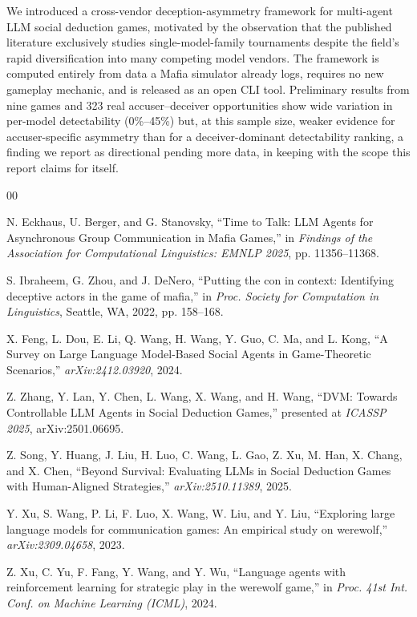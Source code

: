 \documentclass[10pt,conference]{IEEEtran}
\begin{document}
We introduced a cross-vendor deception-asymmetry framework for multi-agent LLM social deduction games, motivated by the observation that the published literature exclusively studies single-model-family tournaments despite the field's rapid diversification into many competing model vendors. The framework is computed entirely from data a Mafia simulator already logs, requires no new gameplay mechanic, and is released as an open CLI tool. Preliminary results from nine games and 323 real accuser--deceiver opportunities show wide variation in per-model detectability (0\%--45\%) but, at this sample size, weaker evidence for accuser-specific asymmetry than for a deceiver-dominant detectability ranking, a finding we report as directional pending more data, in keeping with the scope this report claims for itself.

\begin{thebibliography}{00}

 N. Eckhaus, U. Berger, and G. Stanovsky, ``Time to Talk: LLM Agents for Asynchronous Group Communication in Mafia Games,'' in \textit{Findings of the Association for Computational Linguistics: EMNLP 2025}, pp. 11356--11368.

 S. Ibraheem, G. Zhou, and J. DeNero, ``Putting the con in context: Identifying deceptive actors in the game of mafia,'' in \textit{Proc. Society for Computation in Linguistics}, Seattle, WA, 2022, pp. 158--168.

 X. Feng, L. Dou, E. Li, Q. Wang, H. Wang, Y. Guo, C. Ma, and L. Kong, ``A Survey on Large Language Model-Based Social Agents in Game-Theoretic Scenarios,'' \textit{arXiv:2412.03920}, 2024.

 Z. Zhang, Y. Lan, Y. Chen, L. Wang, X. Wang, and H. Wang, ``DVM: Towards Controllable LLM Agents in Social Deduction Games,'' presented at \textit{ICASSP 2025}, arXiv:2501.06695.

 Z. Song, Y. Huang, J. Liu, H. Luo, C. Wang, L. Gao, Z. Xu, M. Han, X. Chang, and X. Chen, ``Beyond Survival: Evaluating LLMs in Social Deduction Games with Human-Aligned Strategies,'' \textit{arXiv:2510.11389}, 2025.

 Y. Xu, S. Wang, P. Li, F. Luo, X. Wang, W. Liu, and Y. Liu, ``Exploring large language models for communication games: An empirical study on werewolf,'' \textit{arXiv:2309.04658}, 2023.

 Z. Xu, C. Yu, F. Fang, Y. Wang, and Y. Wu, ``Language agents with reinforcement learning for strategic play in the werewolf game,'' in \textit{Proc. 41st Int. Conf. on Machine Learning (ICML)}, 2024.


\end{thebibliography}
\end{document}
